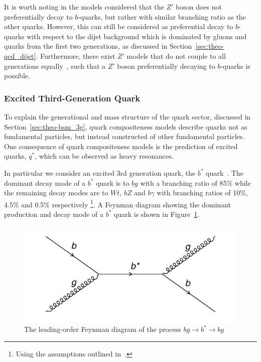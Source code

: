 It is worth noting in the models considered that the $Z'$ boson does not preferentially decay to $b$-quarks, but rather with similar branching ratio as the other quarks.
However, this can still be considered as preferential decay to $b$-quarks with respect to the dijet background
which is dominated by gluons and quarks from the first two generations, as discussed in Section~\ref{sec:theo-qcd_dijet}.
Furthermore, there exist $Z'$ models that do not couple to all generations equally~\cite{theo-bsm_zprime_3g},
such that a $Z'$ boson preferentially decaying to $b$-quarks is possible.

\subsubsection{Excited Third-Generation Quark}
\label{sec:theo-bsm_bstar}

To explain the generational and mass structure of the quark sector, discussed in Section~\ref{sec:theo-bsm_3g},
quark compositeness models describe quarks not as fundamental particles, but instead constructed of other fundamental particles.
One consequence of quark compositeness models is the prediction of excited quarks, $q^{*}$, which can be observed as heavy resonances.

In particular we consider an excited 3rd generation quark, the $b^{*}$ quark~\cite{theo-bsm_bstar}.
The dominant decay mode of a $b^{*}$ quark is to $bg$ with a branching ratio of 85\%
while the remaining decay modes are to $Wt$, $bZ$ and $b\gamma$ with branching ratios of 10\%, 4.5\% and 0.5\% respectively
\footnote{Using the assumptions outlined in~\cite{theo-bsm_bstar}.}.
A Feynman diagram showing the  dominant production and decay mode of a $b^*$ quark is shown in Figure~\ref{fig:theo-bsm_bstar}.

\begin{figure}[!hbt]
  \begin{center}
    \includegraphics[width=0.7\linewidth, angle=0]{figs/Theory/bsm_bstar.png}
  \end{center}
  \caption{The leading-order Feynman diagram of the process $bg \to b^* \to bg$}
  \label{fig:theo-bsm_bstar}
\end{figure}


